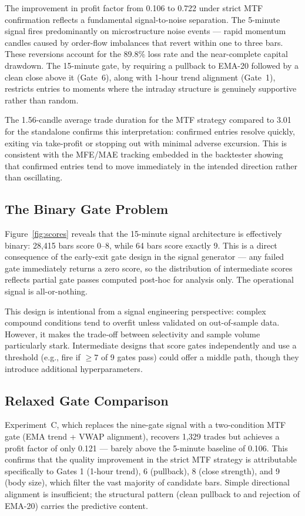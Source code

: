 \documentclass[conference]{IEEEtran}
\begin{document}
The improvement in profit factor from 0.106 to 0.722
under strict MTF confirmation reflects a fundamental
signal-to-noise separation. The 5-minute signal fires
predominantly on microstructure noise events — rapid
momentum candles caused by order-flow imbalances that
revert within one to three bars. These reversions account
for the 89.8\% loss rate and the near-complete capital
drawdown. The 15-minute gate, by requiring a pullback to
EMA-20 followed by a clean close above it (Gate~6), along
with 1-hour trend alignment (Gate~1), restricts entries to
moments where the intraday structure is genuinely
supportive rather than random.

The 1.56-candle average trade duration for the MTF strategy
compared to 3.01 for the standalone confirms this
interpretation: confirmed entries resolve quickly, exiting
via take-profit or stopping out with minimal adverse
excursion. This is consistent with the MFE/MAE tracking
embedded in the backtester showing that confirmed entries
tend to move immediately in the intended direction rather
than oscillating.

\subsection{The Binary Gate Problem}

Figure~\ref{fig:scores} reveals that the 15-minute signal
architecture is effectively binary: 28,415 bars score 0--8,
while 64 bars score exactly 9. This is a direct consequence
of the early-exit gate design in the signal generator — any
failed gate immediately returns a zero score, so the
distribution of intermediate scores reflects partial gate
passes computed post-hoc for analysis only. The operational
signal is all-or-nothing.

This design is intentional from a signal engineering
perspective: complex compound conditions tend to overfit
unless validated on out-of-sample data. However, it makes
the trade-off between selectivity and sample volume
particularly stark. Intermediate designs that score gates
independently and use a threshold (e.g., fire if $\geq 7$
of 9 gates pass) could offer a middle path, though they
introduce additional hyperparameters.

\subsection{Relaxed Gate Comparison}

Experiment~C, which replaces the nine-gate signal with a
two-condition MTF gate (EMA trend + VWAP alignment),
recovers 1,329 trades but achieves a profit factor of only
0.121 — barely above the 5-minute baseline of 0.106. This
confirms that the quality improvement in the strict MTF
strategy is attributable specifically to Gates 1
(1-hour trend), 6 (pullback), 8 (close strength), and
9 (body size), which filter the vast majority of candidate
bars. Simple directional alignment is insufficient; the
structural pattern (clean pullback to and rejection of
EMA-20) carries the predictive content.
\end{document}
